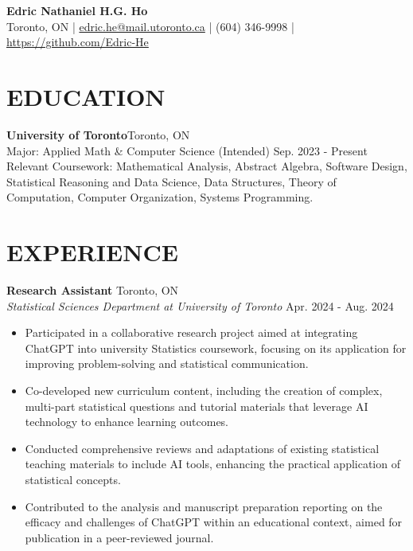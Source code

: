 \documentclass[a4paper,9pt]{extarticle}
\begin{document}
\pagestyle{empty}

\begin{center}
\textbf{\Large Edric Nathaniel H.G. Ho}\\[2pt] %
Toronto, ON | \href{mailto:example@example.com}{edric.he@mail.utoronto.ca} | (604) 346-9998 | \href{https://www.linkedin.com/in/johndoe}{https://github.com/Edric-He}%
\end{center}

\section*{EDUCATION}
\noindent
\textbf{University of Toronto}\hfill Toronto, ON \\ %
Major: Applied Math \& Computer Science (Intended)  \hfill Sep. 2023 - Present\\ %
Relevant Coursework: Mathematical Analysis, Abstract Algebra, Software Design, Statistical Reasoning and Data Science, Data Structures, Theory of Computation, Computer Organization, Systems Programming. %

\section*{EXPERIENCE}
\noindent
\textbf{Research Assistant} \hfill Toronto, ON\\ %
\textit{Statistical Sciences Department at University of Toronto} \hfill Apr. 2024 - Aug. 2024 %
\begin{itemize}
    \item Participated in a collaborative research project aimed at integrating ChatGPT into university Statistics coursework, focusing on its application for improving problem-solving and statistical communication.
    \item Co-developed new curriculum content, including the creation of complex, multi-part statistical questions and tutorial materials that leverage AI technology to enhance learning outcomes.
    \item Conducted comprehensive reviews and adaptations of existing statistical teaching materials to include AI tools, enhancing the practical application of statistical concepts.
    \item Contributed to the analysis and manuscript preparation reporting on the efficacy and challenges of ChatGPT within an educational context, aimed for publication in a peer-reviewed journal.
\end{itemize}
\end{document}

